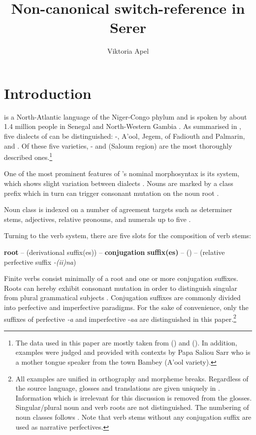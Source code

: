 \documentclass[output=paper
,newtxmath
,modfonts
,nonflat]{langsci/langscibook}
\title{Non-canonical switch-reference in Serer}
\author{Viktoria Apel\affiliation{Humboldt-Universität zu Berlin}}
\begin{document}
\maketitle

\section{Introduction}

 is a North-Atlantic language of the Niger-Congo phylum \citep{Segerer2016} and is spoken by about 1.4 million people in Senegal and North-Western Gambia \citep{SimonsFenning2017}. As summarised in \citet[4]{Renaudier2012}, five dialects of  can be distinguished: -,  A’ool,  Jegem,  of Fadiouth and Palmarin, and  . Of these five varieties, - and   (Saloum region) are the most thoroughly described ones.\footnote{The data used in this paper are mostly taken from \citet{Faye1979} () and \citet{Renaudier2012} (). In addition, examples were judged and provided with contexts by Papa Saliou Sarr who is a mother tongue speaker from the town Bambey (A’ool variety).}

One of the most prominent features of ’s nominal morphosyntax is its  system, which shows slight variation between dialects \citep[see][]{Renaudier2015}. Nouns are marked by a class prefix which in turn can trigger consonant mutation on the noun root \citep{Faye05,McLaughlin94,McLaughlin00,Merrill14,Pozdniakov2006}.

Noun class is indexed on a number of agreement targets such as determiner stems, adjectives, relative pronouns, and numerals up to five \citep[493]{Renaudier2015}.

Turning to the verb system, there are five slots for the composition of verb stems:

\ea\label{ex:apel:1}
\glt \textbf{root} – (derivational suffix(es)) – \textbf{conjugation} \textbf{suffix(es)} –   () – (relative perfective suffix \textit{-(ii)na})
\z

Finite verbs consist minimally of a root and one or more conjugation suffixes. Roots can hereby exhibit consonant mutation in order to distinguish singular from plural grammatical subjects \citep{McLaughlin94,McLaughlin00}. Conjugation suffixes are commonly divided into perfective and imperfective paradigms. For the sake of convenience, only the suffixes of perfective \textit{-a}  and imperfective -\textit{aa}  are distinguished in this paper.\footnote{All examples are unified in orthography and morpheme breaks. Regardless of the source language, glosses and translations are given uniquely in . Information which is irrelevant for this discussion is removed from the glosses. Singular/plural noun and verb roots are not distinguished. The numbering of noun classes follows \citet[118]{Faye1979}. Note that verb stems without any conjugation suffix are used as narrative perfectives.} 
\end{document}
